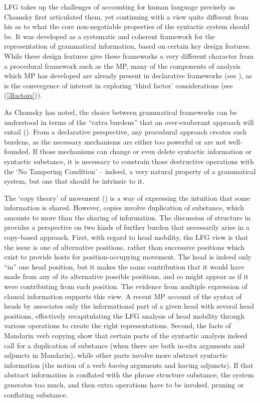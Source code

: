 \documentclass[output=paper,hidelinks]{langscibook}
\begin{document}
LFG takes up the challenges of accounting for human language precisely
as Chomsky first articulated them, yet continuing with a view quite
different from his as to what the core non-negotiable properties of
the syntactic system should be. It was developed as a systematic and
coherent framework for the representation of grammatical information,
based on certain key design features. While these design features give
these frameworks a very different character from a procedural
framework such as the MP, many of the components of analysis which MP
has developed are already present in declarative frameworks (see
), as is the convergence of interest in
exploring `third factor' considerations (see (\ref{3factors})).

As Chomsky has noted, the choice between grammatical frameworks can be
understood in terms of the ``extra burdens'' that an over-exuberant
approach will entail (\citealp[10--11]{chomsky07}). From a declarative
perspective, any procedural approach creates such burdens, as the
necessary mechanisms are either too powerful or are not well-founded.
If those mechanisms can change or even delete syntactic information or
syntactic substance, it is necessary to constrain those destructive
operations with the `No Tampering Condition' -- indeed, a very natural
property of a grammatical system, but one that should be intrinsic to
it.

The `copy theory' of movement (\citealp{chomsky1995the-minimalist}) is
a way of expressing the intuition that some information is
shared. However, copies involve duplication of substance, which
amounts to more than the sharing of information.  The discussion of
structure in  provides a perspective on two
kinds of further burden that necessarily arise in a copy-based
approach. First, with regard to head mobility, the LFG view is that
the issue is one of alternative positions, rather than successive
positions which exist to provide hosts for position-occupying
movement. The head is indeed only ``in'' one head position, but it
makes the same contribution that it would have made from any of its
alternative possible positions, and so might appear as if it were
contributing from each position. The evidence from multiple expression
of clausal information supports this view. A recent MP account of the
syntax of heads by \citet{arrepiet20} associates only the
informational part of a given head with several head positions,
effectively recapitulating the LFG analysis of head mobility through
various operations to create the right representations. Second, the
facts of Mandarin verb copying show that certain parts of the
syntactic analysis indeed call for a duplication of substance (when
there are both in-situ arguments and adjuncts in Mandarin), while
other parts involve more abstract syntactic information (the notion of
a verb \textit{having} arguments and having adjuncts). If that abstract
information is conflated with the phrase structure substance, the
system generates too much, and then extra operations have to be
invoked, pruning or conflating substance.
\end{document}
